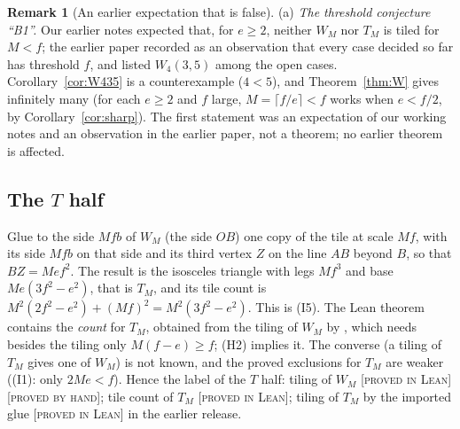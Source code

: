 \documentclass[11pt,reqno]{amsart}
\theoremstyle{plain}
\theoremstyle{definition}
\newtheorem{remark}[theorem]{Remark}
\newcommand{\lab}[1]{\textup{[\textsc{#1}]}}
\newcommand{\PL}{\lab{proved in Lean}}
\newcommand{\PH}{\lab{proved by hand}}
\begin{document}
\begin{remark}[An earlier expectation that is false]\label{rem:refute}
(a) \emph{The threshold conjecture ``B1''.} Our earlier notes expected that, for $e\ge2$, neither $W_M$ nor $T_M$ is tiled for $M<f$; the earlier paper \cite{ReleasePaper} recorded as an observation that every case decided so far has threshold $f$, and listed $W_4(3,5)$ among the open cases. Corollary~\ref{cor:W435} is a counterexample ($4<5$), and Theorem~\ref{thm:W} gives infinitely many (for each $e\ge2$ and $f$ large, $M=\lceil f/e\rceil<f$ works when $e<f/2$, by Corollary~\ref{cor:sharp}).
The first statement was an expectation of our working notes and an observation in the earlier paper, not a theorem; no earlier theorem is affected.
\end{remark}

\subsection{The $T$ half}\label{sub:T}
Glue to the side $Mfb$ of $W_M$ (the side $OB$) one copy of the tile at scale $Mf$, with its side $Mfb$ on that side and its third vertex $Z$ on the line $AB$ beyond $B$, so that $BZ=Mef^2$. The result is the isosceles triangle with legs $Mf^3$ and base $Me(3f^2-e^2)$, that is $T_M$, and its tile count is $M^2(2f^2-e^2)+(Mf)^2=M^2(3f^2-e^2)$.
This is (I5). The Lean theorem  contains the \emph{count} for $T_M$, obtained from the tiling of $W_M$ by , which needs besides the tiling only $M(f-e)\ge f$; (H2) implies it.
The converse (a tiling of $T_M$ gives one of $W_M$) is not known, and the proved exclusions for $T_M$ are weaker ((I1): only $2Me<f$). Hence the label of the $T$ half: tiling of $W_M$ \PL{}\,\PH{}; tile count of $T_M$ \PL{}; tiling of $T_M$ by the imported glue \PL{} in the earlier release.
\end{document}
